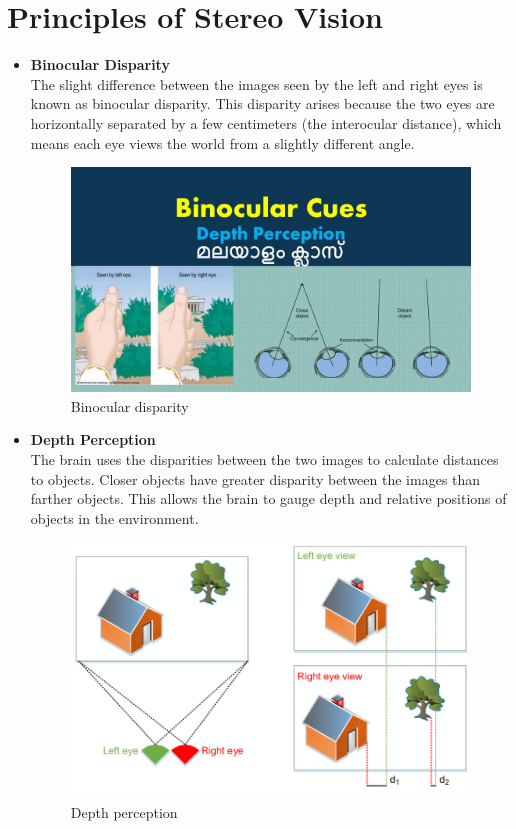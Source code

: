 \documentclass[22pt]{report}
\begin{document}
    \section{Principles of Stereo Vision}
        \begin{itemize}
            \item \textbf{Binocular Disparity}\\
                The slight difference between the images seen by the left and right eyes is known as binocular disparity. This disparity arises because the two eyes are horizontally separated by a few centimeters (the interocular distance), which means each eye views the world from a slightly different angle.
                \begin{figure}[h]
                    \centering
                    \includegraphics[width=0.5\linewidth]{Images/BinocularDisparity.jpg}
                    \caption{Binocular disparity}
                \end{figure}
                
            \item \textbf{Depth Perception}\\
                The brain uses the disparities between the two images to calculate distances to objects. Closer objects have greater disparity between the images than farther objects. This allows the brain to gauge depth and relative positions of objects in the environment.
                \begin{figure}[h]
                    \centering
                    \includegraphics[width=0.5\linewidth]{Images/Depth-perception.png}
                    \caption{Depth perception}
                \end{figure}
                

\end{itemize}
\end{document}
